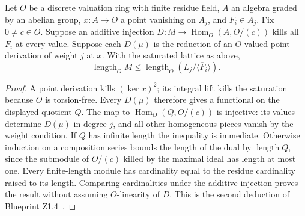
\begin{theorem}\label{pn:P028}
Let \(O\) be a discrete valuation ring with finite residue field, \(A\)
an algebra graded by an abelian group, \(x:A\to O\) a point vanishing on
\(A_j\), and \(F_i\in A_j\). Fix \(0\ne c\in O\). Suppose an
additive injection \(D:M\to\operatorname{Hom}_O(A,O/(c))\) kills all
\(F_i\) at every value. Suppose each \(D(\mu)\) is the reduction of an
\(O\)-valued point derivation of weight \(j\) at \(x\). With the
saturated lattice as above,
\[
 \operatorname{length}_O M \le
 \operatorname{length}_O(L_j/\langle\overline F_i\rangle).
\]
\end{theorem}
\begin{proof}
A point derivation kills \((\ker x)^2\); its integral lift kills the
saturation because \(O\) is torsion-free. Every \(D(\mu)\) therefore
gives a functional on the displayed quotient \(Q\). The map to
\(\operatorname{Hom}_O(Q,O/(c))\) is injective: its values determine
\(D(\mu)\) in degree \(j\), and all other homogeneous pieces vanish
by the weight condition. If \(Q\) has infinite length the inequality
is immediate. Otherwise induction on a composition series bounds
the length of the dual by \(\operatorname{length}Q\), since the
submodule of \(O/(c)\) killed by the maximal ideal has length at most
one. Every finite-length module has cardinality equal to the residue
cardinality raised to its length. Comparing cardinalities under the
additive injection proves the result without assuming \(O\)-linearity
of \(D\). This is the second deduction of Blueprint Z1.4~.
\end{proof}

